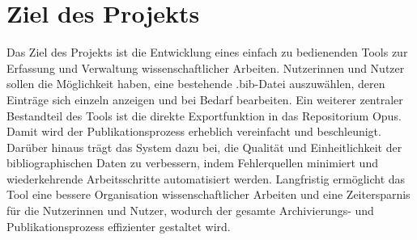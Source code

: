 \section{Ziel des Projekts}
Das Ziel des Projekts ist die Entwicklung eines einfach zu bedienenden 
Tools zur Erfassung und Verwaltung wissenschaftlicher Arbeiten. 
Nutzerinnen und Nutzer sollen die Möglichkeit haben, eine bestehende 
.bib-Datei auszuwählen, deren Einträge sich einzeln anzeigen und bei 
Bedarf bearbeiten. Ein weiterer zentraler Bestandteil des Tools ist die direkte Exportfunktion
in das Repositorium Opus. Damit wird der Publikationsprozess erheblich 
vereinfacht und beschleunigt. Darüber hinaus trägt das System dazu bei, 
die Qualität und Einheitlichkeit der bibliographischen Daten zu verbessern,
indem Fehlerquellen minimiert und wiederkehrende Arbeitsschritte 
automatisiert werden. Langfristig ermöglicht das Tool eine bessere Organisation 
wissenschaftlicher Arbeiten und eine Zeitersparnis für die 
Nutzerinnen und Nutzer, wodurch der gesamte Archivierungs- 
und Publikationsprozess effizienter gestaltet wird.

